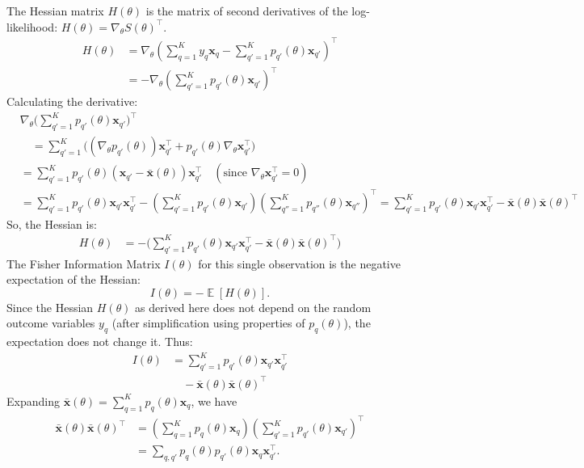 \documentclass{article}
\DeclareMathOperator*{\E}{\mathbb{E}} %
\begin{document}
The Hessian matrix $H(\theta)$ is the matrix of second derivatives of the log-likelihood: $H(\theta) = \nabla_\theta S(\theta)^\top$.
\begin{align*}
H(\theta) &= \nabla_\theta \left( \sum_{q=1}^K y_q \mathbf{x}_q - \sum_{q'=1}^K p_{q'}(\theta) \mathbf{x}_{q'} \right)^\top \\
&= - \nabla_\theta \left( \sum_{q'=1}^K p_{q'}(\theta) \mathbf{x}_{q'} \right)^\top
\end{align*}
Calculating the derivative:
\begin{align*}
&\nabla_\theta \Bigg(
\sum_{q'=1}^K p_{q'}(\theta) \mathbf{x}_{q'} \Bigg)^\top \\
&\quad = \sum_{q'=1}^K \Big( (\nabla_\theta p_{q'}(\theta)) \mathbf{x}_{q'}^\top + p_{q'}(\theta) \nabla_\theta \mathbf{x}_{q'}^\top \Big) \\
&= \sum_{q'=1}^K p_{q'}(\theta) (\mathbf{x}_{q'} - \bar{\mathbf{x}}(\theta)) \mathbf{x}_{q'}^\top \quad (\text{since } \nabla_\theta \mathbf{x}_{q'}^\top = 0) \\
&= \sum_{q'=1}^K p_{q'}(\theta) \mathbf{x}_{q'} \mathbf{x}_{q'}^\top - \left(\sum_{q'=1}^K p_{q'}(\theta) \mathbf{x}_{q'}\right) \left(\sum_{q''=1}^K p_{q''}(\theta) \mathbf{x}_{q''}\right)^\top = \sum_{q'=1}^K p_{q'}(\theta) \mathbf{x}_{q'} \mathbf{x}_{q'}^\top - \bar{\mathbf{x}}(\theta)\bar{\mathbf{x}}(\theta)^\top
\end{align*}
So, the Hessian is:
\begin{align*}
H(\theta) &= - \Big( \sum_{q'=1}^K p_{q'}(\theta) \mathbf{x}_{q'} \mathbf{x}_{q'}^\top  - \bar{\mathbf{x}}(\theta)\bar{\mathbf{x}}(\theta)^\top \Big)
\end{align*}
The Fisher Information Matrix $I(\theta)$ for this single observation is the negative expectation of the Hessian:
\[
I(\theta) = -\E[H(\theta)].
\]
Since the Hessian $H(\theta)$ as derived here does not depend on the random outcome variables $y_q$ (after simplification using properties of $p_q(\theta)$), the expectation does not change it. Thus:
\begin{align*}
I(\theta) &= \sum_{q'=1}^K p_{q'}(\theta) \mathbf{x}_{q'} \mathbf{x}_{q'}^\top \\
&\quad - \bar{\mathbf{x}}(\theta)\bar{\mathbf{x}}(\theta)^\top
\end{align*}
Expanding $\bar{\mathbf{x}}(\theta) = \sum_{q=1}^K p_q(\theta) \mathbf{x}_q$, we have
\begin{align*}
\bar{\mathbf{x}}(\theta)\bar{\mathbf{x}}(\theta)^\top
&= \left(\sum_{q=1}^K p_q(\theta) \mathbf{x}_q\right)
   \left(\sum_{q'=1}^K p_{q'}(\theta) \mathbf{x}_{q'}\right)^\top \\
&= \sum_{q,q'} p_q(\theta) p_{q'}(\theta) \mathbf{x}_q \mathbf{x}_{q'}^\top.
\end{align*}
\end{document}
